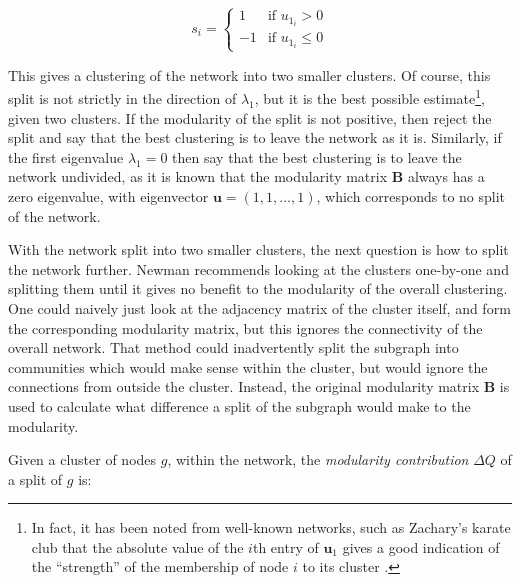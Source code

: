 \begin{equation}
s_i =\left\{ \begin{array}{ll} 1 & \mbox{if } u_{1_i}>0 \\
-1 & \mbox{if } u_{1_i}\leq0 \end{array} \right.
\end{equation}

This gives a clustering of the network into two smaller clusters. Of course, 
this split is not strictly in the direction of $\lambda_1$, but it is the best 
possible estimate\footnote{In fact, it has been noted from well-known networks, 
such as Zachary's karate club \citep{Zachary1977a} that the absolute value of 
the $i$th entry of $\mathbf{u}_1$ gives a good indication of the ``strength'' 
of the membership of node $i$ to its cluster \citep{Newman2006a}.}, given two 
clusters. If the modularity of the split is not positive, then reject the 
split and say that the best clustering is to leave the network as it is.  
Similarly, if the first eigenvalue $\lambda_1 = 0$ then say that the best 
clustering is to leave the network undivided, as it is known that the modularity 
matrix $\mathbf{B}$ always has a zero eigenvalue, with eigenvector 
$\mathbf{u} = ( 1,1, \ldots, 1)$, which corresponds to no split of the network.

With the network split into two smaller clusters, the next
question is how to split the network further.  Newman \citep{Newman2006a} recommends looking at the clusters
one-by-one and splitting them until it gives no benefit to the modularity
of the overall clustering.  One could naively just look at the
adjacency matrix of the cluster itself, and form the 
corresponding modularity matrix, but this ignores the connectivity of the
overall network.  That method could inadvertently split the subgraph into communities 
which would make sense within the cluster, but would ignore the connections 
from outside the cluster. Instead, the original modularity 
matrix $\mathbf{B}$ is used to calculate what difference a split of the subgraph would 
make to the modularity.

Given a cluster of nodes $g$, within the network, the \emph{modularity contribution} $\Delta Q$ of a 
split of $g$ is:

